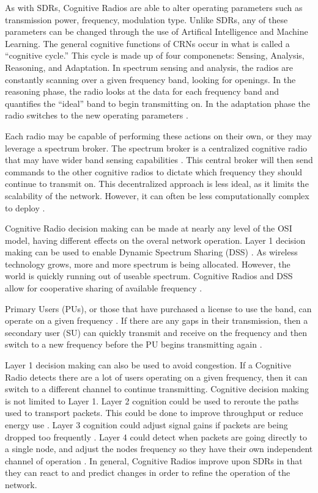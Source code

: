 As with SDRs, Cognitive Radios are able to alter operating parameters such as transmission power, frequency, modulation type. Unlike SDRs, any of these parameters can be changed through the use of Artifical Intelligence and Machine Learning. The general cognitive functions of CRNs occur in what is called a ``cognitive cycle.'' \cite{5639025} This cycle is made up of four componenets: Sensing, Analysis, Reasoning, and Adaptation. In spectrum sensing and analysis, the radios are constantly scanning over a given frequency band, looking for openings. In the reasoning phase, the radio looks at the data for each frequency band and quantifies the ``ideal'' band to begin transmitting on. In the adaptation phase the radio switches to the new operating parameters \cite{5639025}. 

Each radio may be capable of performing these actions on their own, or they may leverage a spectrum broker. The spectrum broker is a centralized cognitive radio that may have wider band sensing capabilities \cite{5639025}. This central broker will then send commands to the other cognitive radios to dictate which frequency they should continue to transmit on. This decentralized approach is less ideal, as it limits the scalability of the network. However, it can often be less computationally complex to deploy \cite{5639025}. 

Cognitive Radio decision making can be made at nearly any level of the OSI model, having different effects on the overal network operation. Layer 1 decision making can be used to enable Dynamic Spectrum Sharing (DSS) \cite{5771952}. As wireless technology grows, more and more spectrum is being allocated. However, the world is quickly running out of useable spectrum. Cognitive Radios and DSS allow for cooperative sharing of available frequency \cite{5771952}. 

Primary Users (PUs), or those that have purchased a license to use the band, can operate on a given frequency \cite{4562561}. If there are any gaps in their transmission, then a secondary user (SU) can quickly transmit and receive on the frequency and then switch to a new frequency before the PU begins transmitting again \cite{4562561}. 

Layer 1 decision making can also be used to avoid congestion. If a Cognitive Radio detects there are a lot of users operating on a given frequency, then it can switch to a different channel to continue transmitting.\cite{Akyildiz2007921} Cognitive decision making is not limited to Layer 1. Layer 2 cognition could be used to reroute the paths used to transport packets. This could be done to improve throughput or reduce energy use \cite{6527405}. Layer 3 cognition could adjust signal gains if packets are being dropped too frequently \cite{6072038}. Layer 4 could detect when packets are going directly to a single node, and adjust the nodes frequency so they have their own independent channel of operation \cite{5062176}. In general, Cognitive Radios improve upon SDRs in that they can react to and predict changes in order to refine the operation of the network. 


